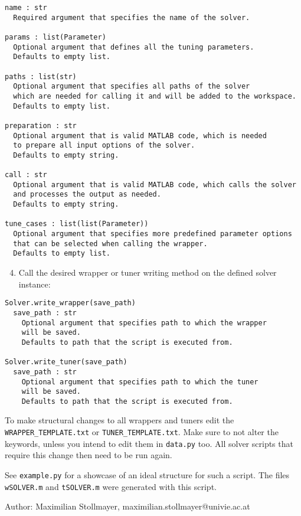 \documentclass[]{article}
\providecommand{\tightlist}{%
  \setlength{\itemsep}{0pt}\setlength{\parskip}{0pt}}
\begin{document}
\begin{verbatim}
name : str
  Required argument that specifies the name of the solver.

params : list(Parameter)
  Optional argument that defines all the tuning parameters.
  Defaults to empty list.

paths : list(str)
  Optional argument that specifies all paths of the solver
  which are needed for calling it and will be added to the workspace.
  Defaults to empty list.

preparation : str
  Optional argument that is valid MATLAB code, which is needed
  to prepare all input options of the solver.
  Defaults to empty string.

call : str
  Optional argument that is valid MATLAB code, which calls the solver
  and processes the output as needed.
  Defaults to empty string.

tune_cases : list(list(Parameter))
  Optional argument that specifies more predefined parameter options
  that can be selected when calling the wrapper.
  Defaults to empty list.
\end{verbatim}

\begin{enumerate}

\setcounter{enumi}{3}
\tightlist
\item
  Call the desired wrapper or tuner writing method on the defined solver
  instance:
\end{enumerate}

\begin{verbatim}
Solver.write_wrapper(save_path)
  save_path : str
    Optional argument that specifies path to which the wrapper
    will be saved.
    Defaults to path that the script is executed from.

Solver.write_tuner(save_path)
  save_path : str
    Optional argument that specifies path to which the tuner
    will be saved.
    Defaults to path that the script is executed from.
\end{verbatim}

To make structural changes to all wrappers and tuners edit the
\texttt{WRAPPER\_TEMPLATE.txt} or \texttt{TUNER\_TEMPLATE.txt}. Make
sure to not alter the keywords, unless you intend to edit them in
\texttt{data.py} too. All solver scripts that require this change then
need to be run again.

See \texttt{example.py} for a showcase of an ideal structure for such a
script. The files \texttt{wSOLVER.m} and \texttt{tSOLVER.m} were
generated with this script.

Author: Maximilian Stollmayer, maximilian.stollmayer@univie.ac.at
\end{document}
